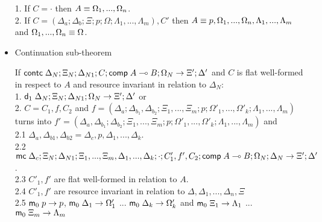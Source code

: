 \begin{itemize}
1. If $C = \cdot$ then $A \equiv \Omega_1, ..., \Omega_n$.\\
2. If $C = (\Delta_a; \Delta_b; \Xi; p; \Omega; \Lambda_1, ..., \Lambda_m), C'$ then $A \equiv p, \Omega_1, ..., \Omega_n, \Lambda_1, ..., \Lambda_m$ and $\Omega_1, ..., \Omega_n \equiv \Omega$.

\item Continuation sub-theorem

If $\mathsf{contc} \; \Delta_N; \Xi_N; \Delta_{N1}; C; \mathsf{comp} \; A \multimap B; \Omega_N \rightarrow \Xi'; \Delta'$ and $C$ is flat well-formed in respect to $A$ and resource invariant in relation to $\Delta_N$: \\
1. \hspace{1cm} $\mathsf{d}_1 \; \Delta_N; \Xi_N; \Delta_{N1}; \Omega_N \rightarrow \Xi'; \Delta'$ or \\
2. \hspace{1cm} $C = C_1, f, C_2$ and $f = (\Delta_a; \Delta_{b_1}, \Delta_{b_2}; \Xi_1, ..., \Xi_m; p; \Omega'_1, ..., \Omega'_k; \Lambda_1, ..., \Lambda_m)$ turns into $f' = (\Delta_a, \Delta_{b_1}; \Delta_{b_2}; \Xi_1, ..., \Xi_m; p; \Omega'_1, ..., \Omega'_k; \Lambda_1, ..., \Lambda_m)$ and\\
2.1 \hspace{2cm} $\Delta_a, \Delta_{b1}, \Delta_{b2} = \Delta_c, p, \Delta_1, ..., \Delta_k$. \\
2.2 \hspace{2cm} $\mathsf{mc} \; \Delta_c; \Xi_N; \Delta_{N1}; \Xi_1, ..., \Xi_m, \Delta_1, ..., \Delta_k; \cdot; C'_1, f', C_2; \mathsf{comp} \; A \multimap B; \Omega_N; \Delta_N \rightarrow \Xi'; \Delta'$. \\
2.3 \hspace{2cm} $C'_1, f'$ are flat well-formed in relation to $A$. \\
2.4 \hspace{2cm} $C'_1, f'$ are resource invariant in relation to $\Delta, \Delta_1, ..., \Delta_n, \Xi$ \\
2.5 \hspace{2cm} $\mathsf{m}_0 \; p \rightarrow p$, $\mathsf{m}_0 \; \Delta_1 \rightarrow \Omega'_1$ ... $\mathsf{m}_0 \; \Delta_k \rightarrow \Omega'_k$ and $\mathsf{m}_0 \; \Xi_1 \rightarrow \Lambda_1$ ... $\mathsf{m}_0 \; \Xi_m \rightarrow \Lambda_m$\\

\end{itemize}

